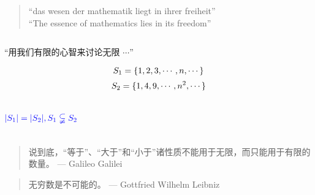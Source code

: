 \begin{frame}{}

  \pause
  \begin{quote}
    \begin{center}
    ``das wesen der mathematik liegt in ihrer freiheit'' \\[8pt]
    \pause
    ``The essence of mathematics lies in its freedom''
    \end{center}
  \end{quote}
\end{frame}

\begin{frame}{}
  \begin{columns}
  \end{columns}
\end{frame}

\begin{frame}{}
  \centerline{``用我们有限的心智来讨论无限 $\cdots$''}

  \[
    S_1 = \{1, 2, 3, \cdots, n, \cdots\}
  \]
  \[
    S_2 = \{1, 4, 9, \cdots, n^2, \cdots\}
  \]

  \begin{columns}
      \pause
      \[
	\textcolor{blue}{|S_1| = |S_2|, S_1 \subsetneqq S_2}
      \]

      \pause
      \centerline{}
      \pause
  \end{columns}

  \pause
  \vspace{0.20cm}
  \begin{quote}
    说到底，``等于''、``大于''和``小于''诸性质不能用于无限，而只能用于有限的数量。 \hfill --- Galileo Galilei
  \end{quote}

  \pause
  \vspace{0.20cm}
  \begin{quote}
    无穷数是不可能的。 \hfill --- Gottfried Wilhelm Leibniz
  \end{quote}
\end{frame}

